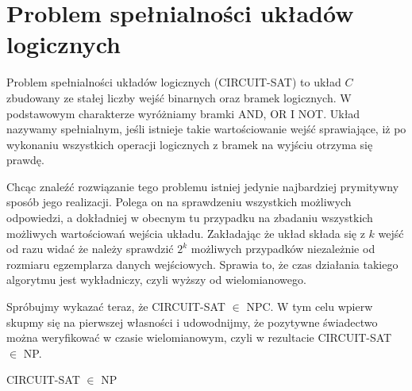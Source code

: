 \section{Problem spełnialności układów logicznych}

Problem spełnialności układów logicznych (CIRCUIT-SAT) to układ $C$ zbudowany ze stałej liczby wejść binarnych oraz bramek logicznych. W podstawowym charakterze wyróżniamy bramki AND, OR I NOT. Układ nazywamy spełnialnym, jeśli istnieje takie wartościowanie wejść sprawiające, iż po wykonaniu wszystkich operacji logicznych z bramek na wyjściu otrzyma się prawdę.

Chcąc znaleźć rozwiązanie tego problemu istniej jedynie najbardziej prymitywny sposób jego realizacji. Polega on na sprawdzeniu wszystkich możliwych odpowiedzi, a dokładniej w obecnym tu przypadku na zbadaniu wszystkich możliwych wartościowań wejścia układu. Zakładając że układ składa się z $k$ wejść od razu widać że należy sprawdzić $2^{k}$ możliwych przypadków niezależnie od rozmiaru egzemplarza danych wejściowych. Sprawia to, że czas działania takiego algorytmu jest wykładniczy, czyli wyższy od wielomianowego.

Spróbujmy wykazać teraz, że CIRCUIT-SAT $\in$ NPC. W tym celu wpierw skupmy się na pierwszej własności i udowodnijmy, że pozytywne świadectwo można weryfikować w czasie wielomianowym, czyli w rezultacie CIRCUIT-SAT $\in$ NP.

\begin{lem} 
CIRCUIT-SAT $\in$ NP
\end{lem}

